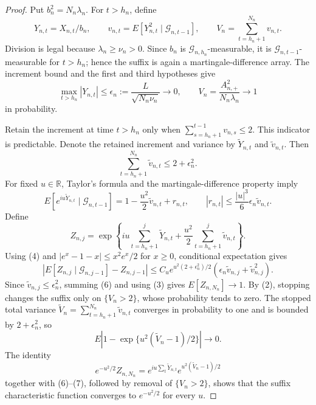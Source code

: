 \documentclass{article}
\begin{document}
\begin{proof}
Put \(b_n^2=N_n\lambda_n\). For \(t>h_n\), define
\[
 Y_{n,t}=X_{n,t}/b_n,\qquad
 v_{n,t}=E[Y_{n,t}^2\mid\mathcal G_{n,t-1}],\qquad
 V_n=\sum_{t=h_n+1}^{N_n}v_{n,t}.
\tag{1}
\]
Division is legal because \(\lambda_n\ge\nu_n>0\). Since \(b_n\) is \(\mathcal G_{n,h_n}\)-measurable, it is \(\mathcal G_{n,t-1}\)-measurable for \(t>h_n\); hence the suffix is again a martingale-difference array. The increment bound and the first and third hypotheses give
\[
 \max_{t>h_n}|Y_{n,t}|
 \le\epsilon_n:=\frac{L}{\sqrt{N_n\nu_n}}\longrightarrow0,
 \qquad V_n=\frac{A_{n,+}^2}{N_n\lambda_n}\longrightarrow1
\tag{2}
\]
in probability.

Retain the increment at time \(t>h_n\) only when \(\sum_{s=h_n+1}^{t-1}v_{n,s}\le2\). This indicator is predictable. Denote the retained increment and variance by \(\widetilde Y_{n,t}\) and \(\widetilde v_{n,t}\). Then
\[
 \sum_{t=h_n+1}^{N_n}\widetilde v_{n,t}\le2+\epsilon_n^2.
\tag{3}
\]
For fixed \(u\in\mathbb R\), Taylor's formula and the martingale-difference property imply
\[
 E[e^{iu\widetilde Y_{n,t}}\mid\mathcal G_{n,t-1}]
 =1-\frac{u^2}{2}\widetilde v_{n,t}+r_{n,t},
 \qquad |r_{n,t}|\le\frac{|u|^3}{6}\epsilon_n\widetilde v_{n,t}.
\tag{4}
\]
Define
\[
 Z_{n,j}=\exp\!\left\{iu\sum_{t=h_n+1}^j\widetilde Y_{n,t}
 +\frac{u^2}{2}\sum_{t=h_n+1}^j\widetilde v_{n,t}\right\}.
\tag{5}
\]
Using (4) and \(|e^x-1-x|\le x^2e^x/2\) for \(x\ge0\), conditional expectation gives
\[
 \left|E[Z_{n,j}\mid\mathcal G_{n,j-1}]-Z_{n,j-1}\right|
 \le C_u e^{u^2(2+\epsilon_n^2)/2}
 \left(\epsilon_n\widetilde v_{n,j}+\widetilde v_{n,j}^2\right).
\tag{6}
\]
Since \(\widetilde v_{n,j}\le\epsilon_n^2\), summing (6) and using (3) gives \(E[Z_{n,N_n}]\to1\). By (2), stopping changes the suffix only on \(\{V_n>2\}\), whose probability tends to zero. The stopped total variance \(\widetilde V_n=\sum_{t=h_n+1}^{N_n}\widetilde v_{n,t}\) converges in probability to one and is bounded by \(2+\epsilon_n^2\), so
\[
 E\left|1-\exp\{u^2(\widetilde V_n-1)/2\}\right|\longrightarrow0.
\tag{7}
\]
The identity
\[
 e^{-u^2/2}Z_{n,N_n}
 =e^{iu\sum_t\widetilde Y_{n,t}}
 e^{u^2(\widetilde V_n-1)/2}
\]
together with (6)--(7), followed by removal of \(\{V_n>2\}\), shows that the suffix characteristic function converges to \(e^{-u^2/2}\) for every \(u\).


\end{proof}
\end{document}
